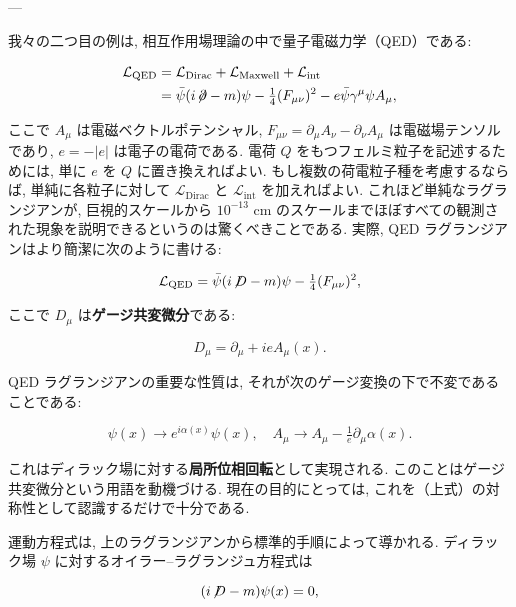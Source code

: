 \documentclass[a4paper,12pt]{article}
\begin{document}
---

我々の二つ目の例は, 相互作用場理論の中で量子電磁力学（QED）である:

\begin{align*}
\mathcal{L}_{\text{QED}} &= \mathcal{L}_{\text{Dirac}} + \mathcal{L}_{\text{Maxwell}} + \mathcal{L}_{\text{int}} \\
&= \bar{\psi}(i\!\not\!\partial - m)\psi - \tfrac{1}{4}(F_{\mu\nu})^2 - e \bar{\psi}\gamma^\mu \psi A_\mu ,
\end{align*}

ここで $A_\mu$ は電磁ベクトルポテンシャル, $F_{\mu\nu} = \partial_\mu A_\nu - \partial_\nu A_\mu$ は電磁場テンソルであり, 
$e = -|e|$ は電子の電荷である. 
電荷 $Q$ をもつフェルミ粒子を記述するためには, 単に $e$ を $Q$ に置き換えればよい. 
もし複数の荷電粒子種を考慮するならば, 単純に各粒子に対して $\mathcal{L}_{\text{Dirac}}$ と $\mathcal{L}_{\text{int}}$ を加えればよい. 
これほど単純なラグランジアンが, 巨視的スケールから $10^{-13}$ cm のスケールまでほぼすべての観測された現象を説明できるというのは驚くべきことである. 
実際, QED ラグランジアンはより簡潔に次のように書ける:

\begin{equation*}
\mathcal{L}_{\text{QED}} = \bar{\psi}(i\!\not\!D - m)\psi - \tfrac{1}{4}(F_{\mu\nu})^2 ,
\end{equation*}

ここで $D_\mu$ は\textbf{ゲージ共変微分}である:

\begin{equation*}
D_\mu = \partial_\mu + i e A_\mu(x) .
\end{equation*}

QED ラグランジアンの重要な性質は, それが次のゲージ変換の下で不変であることである:

\begin{equation*}
\psi(x) \to e^{i\alpha(x)}\psi(x), \quad A_\mu \to A_\mu - \tfrac{1}{e}\partial_\mu \alpha(x) .
\end{equation*}

これはディラック場に対する\textbf{局所位相回転}として実現される. 
このことはゲージ共変微分という用語を動機づける. 
現在の目的にとっては, これを（上式）の対称性として認識するだけで十分である.

運動方程式は, 上のラグランジアンから標準的手順によって導かれる. 
ディラック場 $\psi$ に対するオイラー--ラグランジュ方程式は

\begin{equation*}
(i\!\not\!D - m)\psi(x) = 0 ,
\end{equation*}
\end{document}
